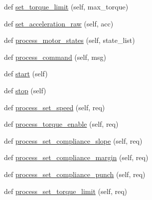 \begin{DoxyCompactItemize}
\item 
def \hyperlink{classdynamixel__controllers_1_1joint__position__controller_1_1_joint_position_controller_a6dcbc91c0934cf7a77e3b91156b7b62e}{set\+\_\+torque\+\_\+limit} (self, max\+\_\+torque)
\item 
def \hyperlink{classdynamixel__controllers_1_1joint__position__controller_1_1_joint_position_controller_a587671fc4cf186ccc583b5cce53bcb17}{set\+\_\+acceleration\+\_\+raw} (self, acc)
\item 
def \hyperlink{classdynamixel__controllers_1_1joint__position__controller_1_1_joint_position_controller_a3ef4e39b3b625fbdb5a9b418b97fcf05}{process\+\_\+motor\+\_\+states} (self, state\+\_\+list)
\item 
def \hyperlink{classdynamixel__controllers_1_1joint__position__controller_1_1_joint_position_controller_af81781a3d97047b957206165ad3d2fd3}{process\+\_\+command} (self, msg)
\item 
def \hyperlink{classdynamixel__controllers_1_1joint__controller_1_1_joint_controller_a8da16a8b801f868a4de7c68d6adc851f}{start} (self)
\item 
def \hyperlink{classdynamixel__controllers_1_1joint__controller_1_1_joint_controller_a978da6ac850b0dd6a67ebe4a23f8fcdc}{stop} (self)
\item 
def \hyperlink{classdynamixel__controllers_1_1joint__controller_1_1_joint_controller_a97af096c1566307859ed168c900fa8a6}{process\+\_\+set\+\_\+speed} (self, req)
\item 
def \hyperlink{classdynamixel__controllers_1_1joint__controller_1_1_joint_controller_a2181fcf467234ed09e378a93ea5a0553}{process\+\_\+torque\+\_\+enable} (self, req)
\item 
def \hyperlink{classdynamixel__controllers_1_1joint__controller_1_1_joint_controller_a6390c0c20afc0581dd3b1122c894d175}{process\+\_\+set\+\_\+compliance\+\_\+slope} (self, req)
\item 
def \hyperlink{classdynamixel__controllers_1_1joint__controller_1_1_joint_controller_aed0bae387958b56f88fd707e9da9e8f1}{process\+\_\+set\+\_\+compliance\+\_\+margin} (self, req)
\item 
def \hyperlink{classdynamixel__controllers_1_1joint__controller_1_1_joint_controller_ac3d7aea8d47f24ab10c1162f34cce44f}{process\+\_\+set\+\_\+compliance\+\_\+punch} (self, req)
\item 
def \hyperlink{classdynamixel__controllers_1_1joint__controller_1_1_joint_controller_aa199ce6ae353ed44fe71ae96a5da242d}{process\+\_\+set\+\_\+torque\+\_\+limit} (self, req)

\end{DoxyCompactItemize}
